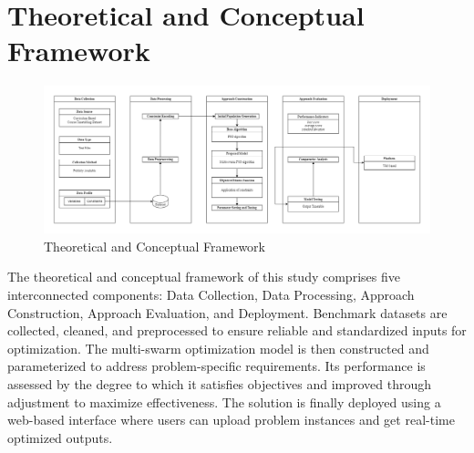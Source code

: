 \section{Theoretical and Conceptual Framework}
\label{sec:theoreticalframework}

\begin{figure}[h] %
    \centering
    \includegraphics[width=1\textwidth]{framework}
    \caption{Theoretical and Conceptual Framework}
    \label{fig:framework} %
\end{figure}

The theoretical and conceptual framework of this study comprises five interconnected components: Data Collection, Data Processing, Approach Construction, Approach Evaluation, and Deployment. Benchmark datasets are collected, cleaned, and preprocessed to ensure reliable and standardized inputs for optimization. The multi-swarm optimization model is then constructed and parameterized to address problem-specific requirements. Its performance is assessed by the degree to which it satisfies objectives and improved through adjustment to maximize effectiveness. The solution is finally deployed using a web-based interface where users can upload problem instances and get real-time optimized outputs.